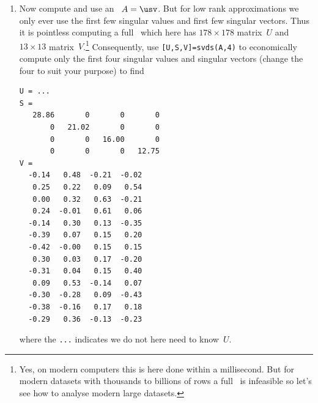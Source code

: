 \begin{example}
\begin{solution}
\begin{enumerate}
But now a further issue arises: the values in the columns are of widely different magnitudes; moreover, each column has different physical units (in contrast, the Iris flower measurements were all cm).
In practice we \emph{must not} mix together quantities with different physical units. 
The general rule, after making each column zero mean, is to scale each column by dividing by its ,  equivalently by its root-mean-square.
This scaling does two practically useful things: 
\begin{itemize}
\item since the standard deviation measures the spread of data in a column, it has the same physical units as the column of data, so dividing by it renders the results dimensionless, and so suitable for mixing with other scaled columns;
\item also the spread of data in each column is now comparable to each other, namely around about size one, instead of some columns being of the order of one-tenths and other columns being in the hundreds.
\end{itemize}
Consequently, form the \(178\times13\) matrix to analyse by commands
\begin{verbatim}
meanw=mean(wine(:,2:14))
stdw=std(wine(:,2:14))
A=(wine(:,2:14)-ones(m,1)*meanw)*diag(1./stdw);
\end{verbatim}
where the \verb|std(X)| computes the  of each column of~\verb|X|.

\item Now compute and use an \svd\ \(A=\usv\).
But for low rank approximations we only ever use the first few singular values and first few singular vectors.
Thus it is pointless computing a full \svd\ which here has \(178\times178\) matrix~\(U\) and \(13\times13\) matrix~\(V\).\footnote{Yes, on modern computers this is here done within a millisecond.  But for modern datasets with thousands to billions of rows a full \svd\ is infeasible so let's see how to analyse modern large datasets.}
Consequently, use \verb|[U,S,V]=svds(A,4)| to economically compute only the first four singular values and singular vectors (change the four to suit your purpose) to find \twodp
\begin{verbatim}
U = ...
S =
   28.86       0       0       0
       0   21.02       0       0
       0       0   16.00       0
       0       0       0   12.75
V =
  -0.14   0.48  -0.21  -0.02
   0.25   0.22   0.09   0.54
   0.00   0.32   0.63  -0.21
   0.24  -0.01   0.61   0.06
  -0.14   0.30   0.13  -0.35
  -0.39   0.07   0.15   0.20
  -0.42  -0.00   0.15   0.15
   0.30   0.03   0.17  -0.20
  -0.31   0.04   0.15   0.40
   0.09   0.53  -0.14   0.07
  -0.30  -0.28   0.09  -0.43
  -0.38  -0.16   0.17   0.18
  -0.29   0.36  -0.13  -0.23
\end{verbatim}
where the \verb|...| indicates we do not here need to know~\(U\).


\end{enumerate}
\end{solution}
\end{example}
